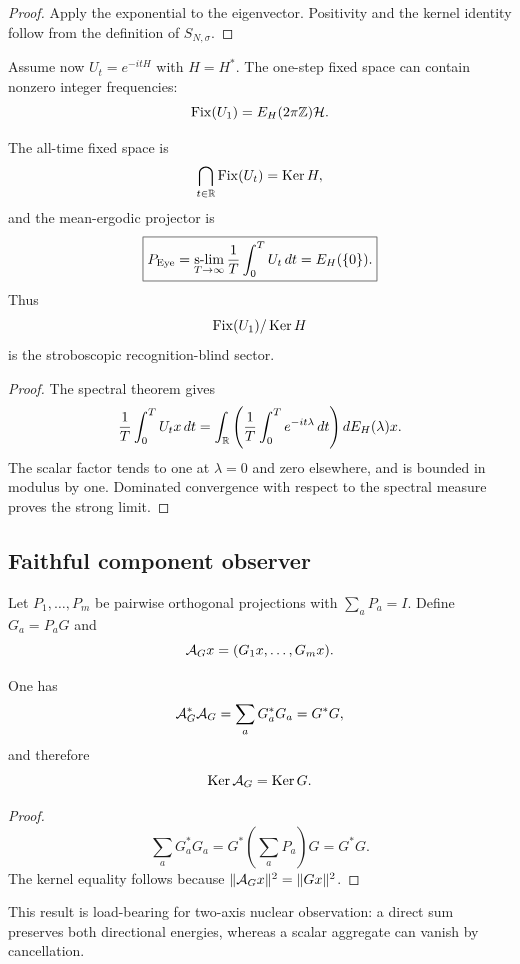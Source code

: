\begin{proof}
Apply the exponential to the eigenvector. Positivity and the kernel identity follow from the definition of $S_{N,\sigma}$.
\end{proof}

Assume now $U_t=e^{-itH}$ with $H=H^*$. The one-step fixed space can contain nonzero integer frequencies:
\[
 \operatorname{Fix}(U_1)=E_H(2\pi\mathbb Z)\mathcal H.
\]

\begin{theorem}\label{thm:eye}
The all-time fixed space is
\[
 \bigcap_{t\in\mathbb R}\operatorname{Fix}(U_t)=\operatorname{Ker} H,
\]
and the mean-ergodic projector is
\[
 \boxed{
 P_{\mathrm{Eye}}=\operatorname*{s-lim}_{T\to\infty}
 \frac1T\int_0^TU_t\,dt=E_H(\{0\}).}
\]
Thus
\[
 \operatorname{Fix}(U_1)/\operatorname{Ker} H
\]
is the stroboscopic recognition-blind sector.
\end{theorem}

\begin{proof}
The spectral theorem gives
\[
 \frac1T\int_0^TU_t x\,dt
 =\int_{\mathbb R}\left(\frac1T\int_0^Te^{-it\lambda}\,dt\right)dE_H(\lambda)x.
\]
The scalar factor tends to one at $\lambda=0$ and zero elsewhere, and is bounded in modulus by one. Dominated convergence with respect to the spectral measure proves the strong limit.
\end{proof}

\subsection{Faithful component observer}

Let $P_1,\ldots,P_m$ be pairwise orthogonal projections with $\sum_aP_a=I$. Define $G_a=P_aG$ and
\[
 \mathcal A_Gx=(G_1x,\ldots,G_mx).
\]

\begin{theorem}
One has
\[
 \mathcal A_G^*\mathcal A_G=\sum_aG_a^*G_a=G^*G,
\]
and therefore
\[
 \operatorname{Ker}\mathcal A_G=\operatorname{Ker} G.
\]
\end{theorem}

\begin{proof}
\[
 \sum_aG_a^*G_a=G^*\left(\sum_aP_a\right)G=G^*G.
\]
The kernel equality follows because $\|\mathcal A_Gx\|^2=\|Gx\|^2$.
\end{proof}

This result is load-bearing for two-axis nuclear observation: a direct sum preserves both directional energies, whereas a scalar aggregate can vanish by cancellation.
